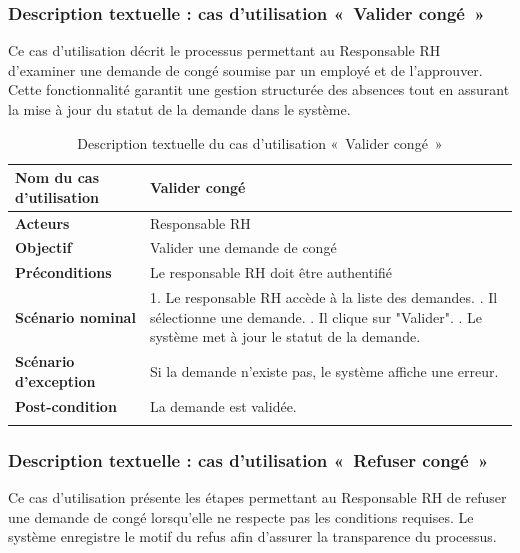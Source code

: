 \subsubsection*{Description textuelle : cas d'utilisation «~Valider congé~»}
Ce cas d'utilisation décrit le processus permettant au Responsable RH d'examiner une demande de congé soumise par un employé et de l'approuver. Cette fonctionnalité garantit une gestion structurée des absences tout en assurant la mise à jour du statut de la demande dans le système.
\setlength{\LTleft}{\fill}
\setlength{\LTright}{\fill}
\begin{longtable}{|p{5cm}|p{9cm}|}
\hline
\textbf{Nom du cas d'utilisation} & Valider congé \\ \hline
\textbf{Acteurs} & Responsable RH \\ \hline
\textbf{Objectif} & Valider une demande de congé \\ \hline
\textbf{Préconditions} & Le responsable RH doit être authentifié \\ \hline
\textbf{Scénario nominal} &
1. Le responsable RH accède à la liste des demandes. \newline
2. Il sélectionne une demande. \newline
3. Il clique sur "Valider". \newline
4. Le système met à jour le statut de la demande. \\ \hline
\textbf{Scénario d'exception} & Si la demande n'existe pas, le système affiche une erreur. \\ \hline
\textbf{Post-condition} & La demande est validée. \\ \hline
\caption{Description textuelle du cas d'utilisation «~Valider congé~»}
\end{longtable}



\subsubsection*{Description textuelle : cas d'utilisation «~Refuser congé~»}
Ce cas d'utilisation présente les étapes permettant au Responsable RH de refuser une demande de congé lorsqu'elle ne respecte pas les conditions requises. Le système enregistre le motif du refus afin d'assurer la transparence du processus.

